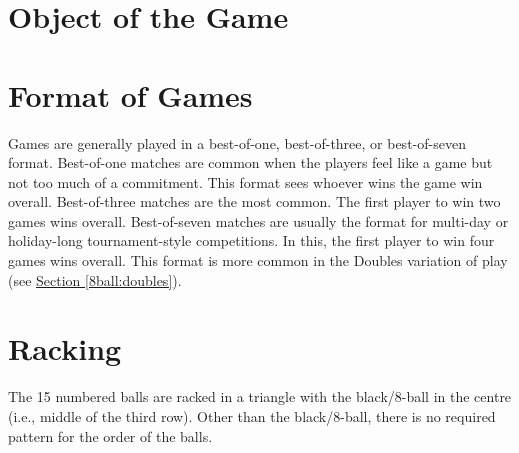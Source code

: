 


\section{Object of the Game} \label{8ball:description}

\section{Format of Games} \label{8ball:format}
 Games are generally played in a best-of-one, best-of-three, or best-of-seven format.%
\subruleitem Best-of-one matches are common when the players feel like a game but not too much of a commitment. This format sees whoever wins the game win overall.%
\subruleitem Best-of-three matches are the most common. The first player to win two games wins overall.%
\subruleitem Best-of-seven matches are usually the format for multi-day or holiday-long tournament-style competitions. In this, the first player to win four games wins overall. This format is more common in the Doubles variation of play (see \hyperref[8ball:doubles]{Section \ref*{8ball:doubles}}).%

\section{Racking} \label{8ball:racking}
 \RackingUp[8ball]%
\label{8ball:challengerracks}\DetermineWhoRacks%
\label{8ball:rackpos}\TableDiagram[8ball]%
\subruleitem The 15 numbered balls are racked in a triangle with the black/8-ball in the centre (i.e., middle of the third row). Other than the black/8-ball, there is no required pattern for the order of the balls.%
\subruleitem \TightlyPacked%
\subruleitem \RackPlacement[8ball]%
\subruleitem \RackingTool[8ball]%
\subruleitem \RackInspection[8ball]%

